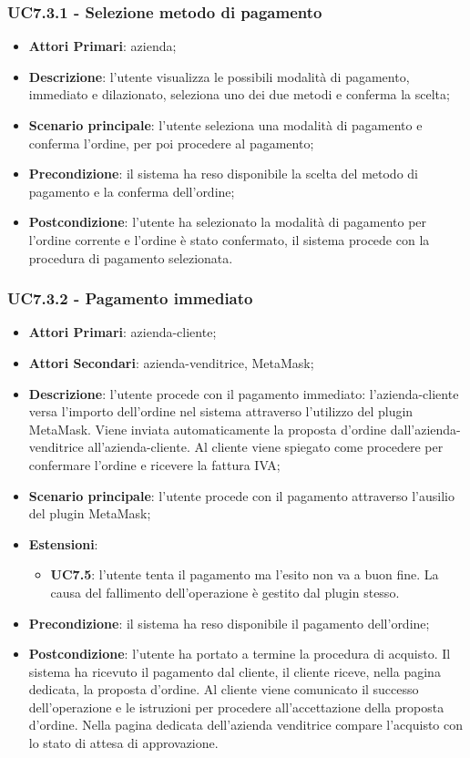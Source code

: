 \subsubsection{UC7.3.1 - Selezione metodo di pagamento}
\begin{itemize}
	\item \textbf{Attori Primari}: azienda;
	\item \textbf{Descrizione}: l'utente visualizza le possibili modalità di pagamento, immediato e dilazionato\glo, seleziona uno dei due metodi e conferma la scelta;
	\item \textbf{Scenario principale}: l'utente seleziona una modalità di pagamento e conferma l'ordine, per poi procedere al pagamento;
	\item \textbf{Precondizione}: il sistema ha reso disponibile la scelta del metodo di pagamento e la conferma dell'ordine;
	\item \textbf{Postcondizione}: l'utente ha selezionato la modalità di pagamento per l'ordine corrente e l'ordine è stato confermato, il sistema procede con la procedura di pagamento selezionata.
\end{itemize}

\subsubsection{UC7.3.2 - Pagamento immediato}
\begin{itemize}
	\item \textbf{Attori Primari}: azienda-cliente;
	\item \textbf{Attori Secondari}: azienda-venditrice, MetaMask\glo;
	\item \textbf{Descrizione}: l'utente procede con il pagamento immediato: l'azienda-cliente versa l'importo dell'ordine nel sistema attraverso l'utilizzo del plugin MetaMask\glo. Viene inviata automaticamente la proposta d'ordine dall'azienda-venditrice all'azienda-cliente. Al cliente viene spiegato come procedere per confermare l'ordine e ricevere la fattura IVA;
	\item \textbf{Scenario principale}: l'utente procede con il pagamento attraverso l'ausilio del plugin MetaMask\glo;
	\item \textbf{Estensioni}: 
	\begin{itemize}
		\item \textbf{UC7.5}: l'utente tenta il pagamento ma l'esito non va a buon fine. La causa del fallimento dell'operazione è gestito dal plugin stesso.
	\end{itemize}
	\item \textbf{Precondizione}: il sistema ha reso disponibile il pagamento dell'ordine;
	\item \textbf{Postcondizione}: l'utente ha portato a termine la procedura di acquisto. Il sistema ha ricevuto il pagamento dal cliente, il cliente riceve, nella pagina dedicata, la proposta d'ordine. Al cliente viene comunicato il successo dell'operazione e le istruzioni per procedere all'accettazione della proposta d'ordine. Nella pagina dedicata dell'azienda venditrice compare l'acquisto con lo stato di attesa di approvazione.
\end{itemize}


